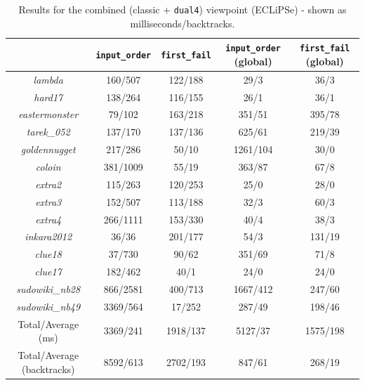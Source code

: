 \begin{table}[H]
\centering
\footnotesize
\bgroup
\def\arraystretch{1.3}
\begin{tabular}{ccc|cc}
\multicolumn{1}{l}{}    & \texttt{input\_order} & \texttt{first\_fail} & \texttt{input\_order} (global) & \texttt{first\_fail} (global) \\ \hline
\textit{lambda} & 160/507 & 122/188 & 29/3 & 36/3 \\
\textit{hard17}  & 138/264 & 116/155 & 26/1 & 36/1 \\
\textit{eastermonster} & 79/102 & 163/218 & 351/51 & 395/78 \\
\textit{tarek\_052} & 137/170 & 137/136 & 625/61 & 219/39 \\
\textit{goldennugget} & 217/286 & 50/10 & 1261/104 & 30/0 \\
\textit{coloin} & 381/1009 & 55/19 & 363/87 & 67/8 \\
\textit{extra2} & 115/263 & 120/253 & 25/0 & 28/0 \\
\textit{extra3} & 152/507 & 113/188 & 32/3 & 60/3 \\
\textit{extra4} & 266/1111 & 153/330 & 40/4 & 38/3 \\
\textit{inkara2012} & 36/36 & 201/177 & 54/3 & 131/19 \\
\textit{clue18} & 37/730 & 90/62 & 351/69 & 71/8 \\
\textit{clue17} & 182/462 & 40/1 & 24/0 & 24/0 \\
\textit{sudowiki\_nb28} & 866/2581 & 400/713 & 1667/412 & 247/60 \\
\textit{sudowiki\_nb49} & 3369/564 & 17/252 & 287/49 & 198/46 \\\hline
Total/Average (ms) & 3369/241 & 1918/137 & 5127/37 & 1575/198 \\
Total/Average (backtracks) & 8592/613 & 2702/193 & 847/61 & 268/19
\end{tabular}
\egroup
\caption{Results for the combined (classic + \texttt{dual4}) viewpoint (ECLiPSe) - shown as milliseconds/backtracks.}
\label{tab:res3}
\end{table}

